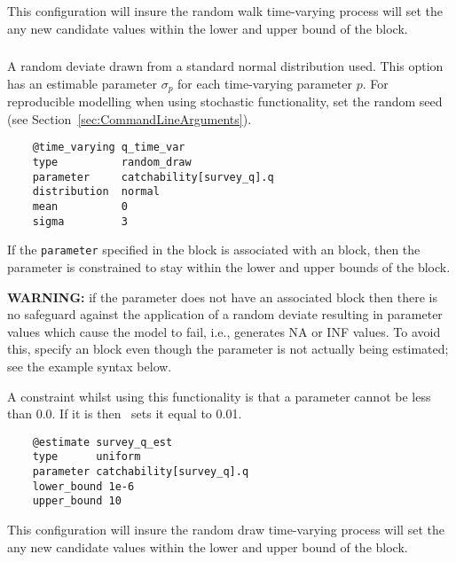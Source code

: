 This configuration will insure the random walk time-varying process will set the any new candidate values within the lower and upper bound of the  block.

\subsubsection[Random Draw]{}\label{sec:TimeVarying-RandomDraw}

A random deviate drawn from a standard normal distribution used. This option has an estimable parameter $\sigma_p$ for each time-varying parameter $p$. For reproducible modelling when using stochastic functionality, set the random seed (see Section~\ref{sec:CommandLineArguments}).

{\small{\begin{verbatim}
	@time_varying q_time_var
	type          random_draw
	parameter     catchability[survey_q].q
	distribution  normal
	mean          0
	sigma         3
\end{verbatim}}}

If the \texttt{parameter} specified in the  block is associated with an  block, then the parameter is constrained to stay within the lower and upper bounds of the  block.

\textbf{WARNING:} if the parameter does not have an associated  block then there is no safeguard against the application of a random deviate resulting in parameter values which cause the model to fail, i.e., generates NA or INF values. To avoid this, specify an  block even though the parameter is not actually being estimated; see the example syntax below.

A constraint whilst using this functionality is that a parameter cannot be less than 0.0. If it is then \CNAME\ sets it equal to 0.01.

{\small{\begin{verbatim}
	@estimate survey_q_est
	type      uniform
	parameter catchability[survey_q].q
	lower_bound 1e-6
	upper_bound 10
\end{verbatim}}}

This configuration will insure the random draw time-varying process will set the any new candidate values within the lower and upper bound of the  block.

\subsection{\label{sec:eq_parser}} 

